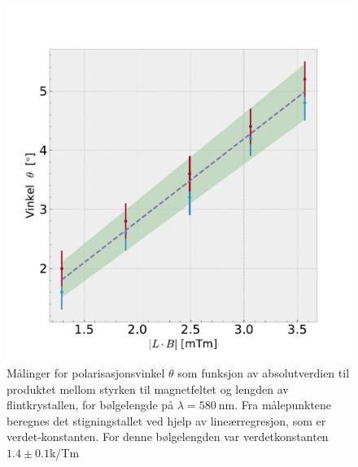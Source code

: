 \documentclass[%
 reprint,
 amsmath,amssymb,
 aps,
]{revtex4-1}
\begin{document}
\begin{figure}[h!]
  \centering
  \includegraphics[scale=0.38]{faraday_effekt.pdf}
  \caption{Målinger for polarisasjonsvinkel $\theta$ som funksjon av absolutverdien til produktet mellom styrken til magnetfeltet og lengden av flintkrystallen, for bølgelengde på $\lambda=\SI{580}{\nano\meter}$. Fra målepunktene beregnes det stigningstallet ved hjelp av lineærregresjon, som er verdet-konstanten. For denne bølgelengden var verdetkonstanten $1.4\pm0.1$k/Tm}
  \label{eksperimentelt_oppsett1}
\end{figure}
{}

\end{document}
